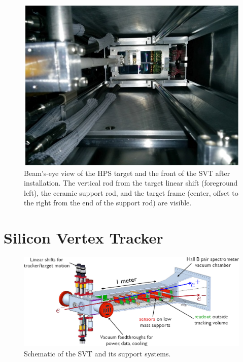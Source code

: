 \begin{figure}[htp]
    \includegraphics[width=\textwidth]{detector/figs/target_photo}
    \caption{Beam's-eye view of the HPS target and the front of the SVT after installation.
    The vertical rod from the target linear shift (foreground left), the ceramic support rod, and the target frame (center, offset to the right from the end of the support rod) are visible.
    }
    \label{fig:target_photo}
\end{figure}

\section{Silicon Vertex Tracker}

\begin{figure}[htp]
    \includegraphics[width=\textwidth]{detector/figs/svt_cutaway}
    \caption{Schematic of the SVT and its support systems.}
    \label{fig:svt-schematic}
\end{figure}

